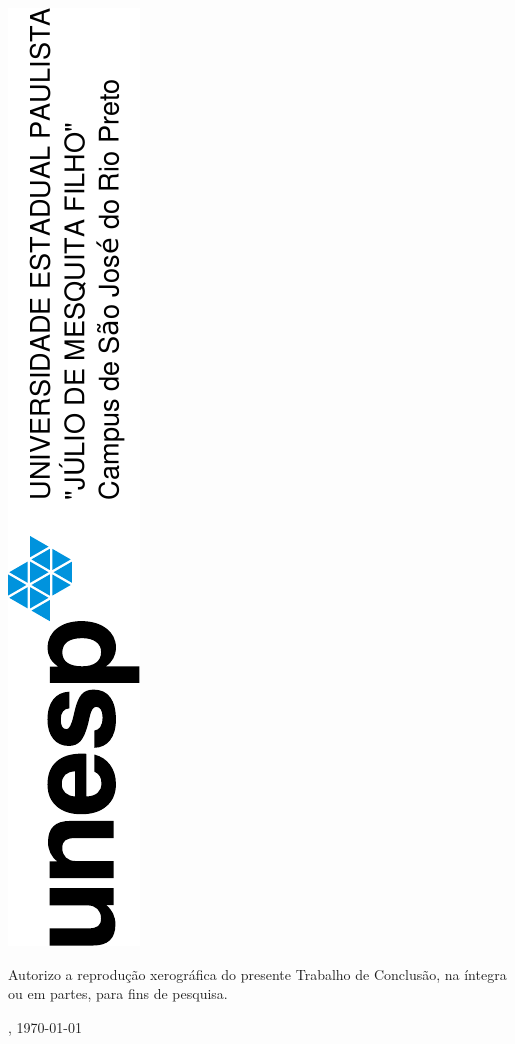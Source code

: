 \thispagestyle{empty}
\center
\centering \includegraphics[angle=-90]{unesp.pdf}
\vspace{2cm}

\begin{vplace}[1]
\par \centering {} 
\end{vplace}

\begin{vplace}[1]
	\par Autorizo a reprodução xerográfica do presente Trabalho de Conclusão, na íntegra ou em partes, para fins de pesquisa.
\end{vplace}

\begin{vplace}[1]
	\imprimirlocal, \today

	\begin{center}
		\assinatura{\imprimirautor}
	\end{center}
\end{vplace}



